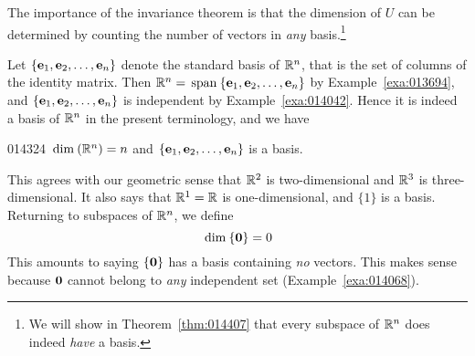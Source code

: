\noindent The importance of the invariance theorem is that the dimension of $U$ can be determined by counting the number of vectors in \textit{any} basis.\footnote{We will show in Theorem~\ref{thm:014407} that every subspace of $\mathbb{R}^n$ does indeed \textit{have} a basis.}

Let $\{\textbf{e}_{1}, \textbf{e}_{2}, \dots, \textbf{e}_{n}\}$ denote the standard basis of $\mathbb{R}^n$, that is the set of columns of the identity matrix. Then $\mathbb{R}^n = \thinspace\operatorname{span\medspace}\{\textbf{e}_{1}, \textbf{e}_{2}, \dots, \textbf{e}_{n}\}$ by Example~\ref{exa:013694}, and $\{\textbf{e}_{1}, \textbf{e}_{2}, \dots, \textbf{e}_{n}\}$ is independent by Example~\ref{exa:014042}. Hence it is indeed a basis of $\mathbb{R}^n$ in the present terminology, and we have

\begin{example}{}{014324}
$\thinspace\operatorname{dim\medspace}(\mathbb{R}^n) = n$ and $\{\textbf{e}_{1}, \textbf{e}_{2}, \dots, \textbf{e}_{n}\}$ is a basis.
\end{example}

This agrees with our geometric sense that $\mathbb{R}^2$ is two-dimensional and $\mathbb{R}^3$ is three-dimensional. It also says that $\mathbb{R}^1 = \mathbb{R}$ is one-dimensional, and $\{1\}$ is a basis. Returning to subspaces of $\mathbb{R}^n$, we define
\begin{equation*}
\thinspace\operatorname{dim\medspace}\{\textbf{0}\} = 0
\end{equation*}
This amounts to saying $\{\textbf{0}\}$ has a basis containing \textit{no} vectors. This makes sense because $\textbf{0}$ cannot belong to \textit{any} independent set (Example~\ref{exa:014068}).

